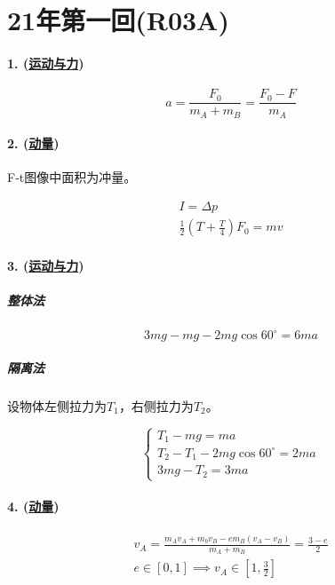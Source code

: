 
\section{21年第一回(R03A)}

\paragraph{1. (\hyperref[subsec:运动与力]{运动与力})}

\begin{equation*}
    a=\frac{F_0}{m_A+m_B}=\frac{F_0-F}{m_A}
\end{equation*}

\paragraph{2. (\hyperref[subsec:动量]{动量})} F-t图像中面积为冲量。

\begin{gather*}
    I=\Delta p\\
    \frac12\left(T+\frac{T}{4}\right)F_0=mv
\end{gather*}

\paragraph{3. (\hyperref[subsec:运动与力]{运动与力})}

\subparagraph{整体法}

\begin{equation*}
    3mg-mg-2mg\cos60^\circ=6ma
\end{equation*}

\subparagraph{隔离法} 设物体左侧拉力为$T_1$，右侧拉力为$T_2$。

\begin{equation*}
    \begin{cases}
        T_1-mg=ma\\
        T_2-T_1-2mg\cos60^\circ=2ma\\
        3mg-T_2=3ma
    \end{cases}
\end{equation*}

\paragraph{4. (\hyperref[subsec:动量]{动量})}

\begin{gather*}
    v_A=\frac{m_Av_A+m_bv_B-em_B(v_A-v_B)}{m_A+m_B}=\frac{3-e}{2}\\
    e\in[0,1]\implies v_A\in\left[1,\frac32\right]
\end{gather*}

